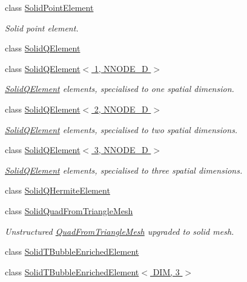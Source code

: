 \begin{DoxyCompactItemize}
class \hyperlink{classoomph_1_1SolidPointElement}{Solid\+Point\+Element}
\begin{DoxyCompactList}\small\item\em Solid point element. \end{DoxyCompactList}\item 
class \hyperlink{classoomph_1_1SolidQElement}{Solid\+Q\+Element}
\item 
class \hyperlink{classoomph_1_1SolidQElement_3_011_00_01NNODE__1D_01_4}{Solid\+Q\+Element$<$ 1, N\+N\+O\+D\+E\+\_\+D $>$}
\begin{DoxyCompactList}\small\item\em \hyperlink{classoomph_1_1SolidQElement}{Solid\+Q\+Element} elements, specialised to one spatial dimension. \end{DoxyCompactList}\item 
class \hyperlink{classoomph_1_1SolidQElement_3_012_00_01NNODE__1D_01_4}{Solid\+Q\+Element$<$ 2, N\+N\+O\+D\+E\+\_\+D $>$}
\begin{DoxyCompactList}\small\item\em \hyperlink{classoomph_1_1SolidQElement}{Solid\+Q\+Element} elements, specialised to two spatial dimensions. \end{DoxyCompactList}\item 
class \hyperlink{classoomph_1_1SolidQElement_3_013_00_01NNODE__1D_01_4}{Solid\+Q\+Element$<$ 3, N\+N\+O\+D\+E\+\_\+D $>$}
\begin{DoxyCompactList}\small\item\em \hyperlink{classoomph_1_1SolidQElement}{Solid\+Q\+Element} elements, specialised to three spatial dimensions. \end{DoxyCompactList}\item 
class \hyperlink{classoomph_1_1SolidQHermiteElement}{Solid\+Q\+Hermite\+Element}
\item 
class \hyperlink{classoomph_1_1SolidQuadFromTriangleMesh}{Solid\+Quad\+From\+Triangle\+Mesh}
\begin{DoxyCompactList}\small\item\em Unstructured \hyperlink{classoomph_1_1QuadFromTriangleMesh}{Quad\+From\+Triangle\+Mesh} upgraded to solid mesh. \end{DoxyCompactList}\item 
class \hyperlink{classoomph_1_1SolidTBubbleEnrichedElement}{Solid\+T\+Bubble\+Enriched\+Element}
\item 
class \hyperlink{classoomph_1_1SolidTBubbleEnrichedElement_3_01DIM_00_013_01_4}{Solid\+T\+Bubble\+Enriched\+Element$<$ D\+I\+M, 3 $>$}

\end{DoxyCompactItemize}
